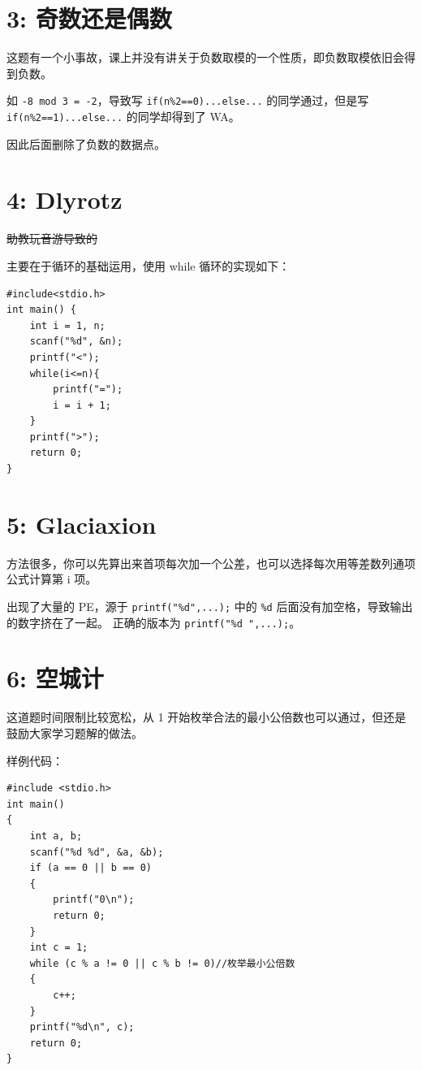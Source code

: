 \documentclass[UTF8]{ctexart}
\newcommand{\code}[1]{\colorbox{gray!10}{\texttt{#1}}}
\begin{document}
\section*{3: 奇数还是偶数}

这题有一个小事故，课上并没有讲关于负数取模的一个性质，即负数取模依旧会得到负数。

如 \code{-8 mod 3 = -2}，导致写 \code{if(n\%2==0)...else...} 的同学通过，但是写 \code{if(n\%2==1)...else...} 的同学却得到了 WA。

因此后面删除了负数的数据点。

\section*{4: Dlyrotz}

\sout{助教玩音游导致的}

主要在于循环的基础运用，使用 while 循环的实现如下：

\begin{lstlisting}
#include<stdio.h>
int main() {
    int i = 1, n;
    scanf("%d", &n);
    printf("<");
    while(i<=n){
        printf("=");
        i = i + 1;
    }
    printf(">");
    return 0;
}
\end{lstlisting}

\section*{5: Glaciaxion}

方法很多，你可以先算出来首项每次加一个公差，也可以选择每次用等差数列通项公式计算第 i 项。

出现了大量的 PE，源于 \code{printf("\%d",...);} 中的 \code{\%d} 后面没有加空格，导致输出的数字挤在了一起。
正确的版本为 \code{printf("\%d ",...);}。

\section*{6: 空城计}

这道题时间限制比较宽松，从 1 开始枚举合法的最小公倍数也可以通过，但还是鼓励大家学习题解的做法。

样例代码：

\begin{lstlisting}
#include <stdio.h>
int main()
{
    int a, b;
    scanf("%d %d", &a, &b);
    if (a == 0 || b == 0)
    {
        printf("0\n");
        return 0;
    }
    int c = 1;
    while (c % a != 0 || c % b != 0)//枚举最小公倍数
    {
        c++;
    }
    printf("%d\n", c);
    return 0;
}
\end{lstlisting}
\end{document}
